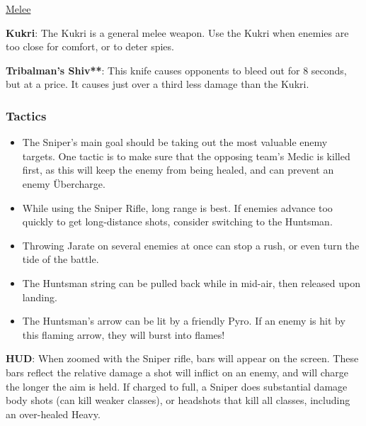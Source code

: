 \newpage

\begin {center}
\underline {Melee}
\end {center}

{\bf Kukri}: The Kukri is a general melee weapon. Use the Kukri when enemies are too close for comfort, or to deter spies.

{\bf Tribalman's Shiv**}: This knife causes opponents to bleed out for 8 seconds, but at a price. It causes just over a third less damage than the Kukri.

\subsubsection {Tactics}
\begin {itemize}

\item The Sniper's main goal should be taking out the most valuable enemy targets. One tactic is to make sure that the opposing team's Medic is killed first, as this will keep the enemy from being healed, and can prevent an enemy Übercharge.

\item While using the Sniper Rifle, long range is best. If enemies advance too quickly to get long-distance shots, consider switching to the Huntsman.

\item Throwing Jarate on several enemies at once can stop a rush, or even turn the tide of the battle.

\item The Huntsman string can be pulled back while in mid-air, then released upon landing.

\item The Huntsman's arrow can be lit by a friendly Pyro. If an enemy is hit by this flaming arrow, they will burst into flames!
\end {itemize}

{\bf HUD}: When zoomed with the Sniper rifle, bars will appear on the screen. These bars reflect the relative damage a shot will inflict on an enemy, and will charge the longer the aim is held. If charged to full, a Sniper does substantial damage body shots (can kill weaker classes), or headshots that kill all classes, including an over-healed Heavy.